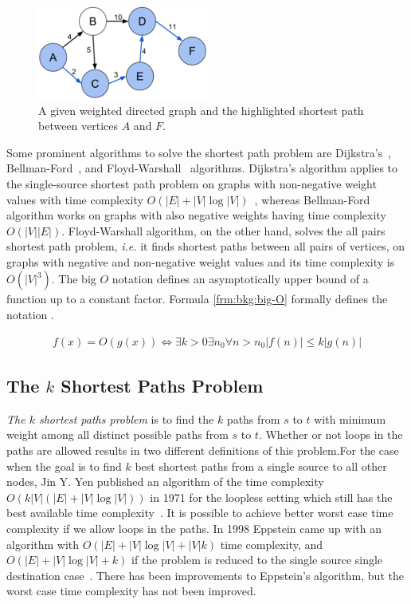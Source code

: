\begin{figure}[!ht]
  \centering
  \includegraphics[width=0.5\textwidth]{figs/background/Shortest_path_with_direct_weights}
  \caption{A given weighted directed graph and the highlighted shortest path between vertices $A$ and $F$.}
  \label{fig:shortest-path1}
\end{figure}

Some prominent algorithms to solve the shortest path problem are Dijkstra's~\cite{dijkstra}, Bellman-Ford~\cite{bellman-ford}, and Floyd-Warshall~\cite{floyd-warshall} algorithms. Dijkstra's algorithm applies to the single-source shortest path problem on graphs with non-negative weight values with time complexity $O(|E| + |V| \log |V|)$~\cite{fredman1987fibonacci}, whereas Bellman-Ford algorithm works on graphs with also negative weights having time complexity $O(|V| |E|)$. Floyd-Warshall algorithm, on the other hand, solves the all pairs shortest path problem, \emph{i.e.} it finds shortest paths between all pairs of vertices, on graphs with negative and non-negative weight values and its time complexity is $O(|V|^3)$. The big $O$ notation defines an asymptotically upper bound of a function up to a constant factor. Formula \ref{frm:bkg:big-O} formally defines the notation \cite{thomas2001introduction}. 

\begin{align}
  f(x) = O(g(x)) \iff \exists k > 0 \exists n_0 \forall n > n_0 |f(n)| \leq k|g(n)|
  \label{frm:bkg:big-O}
\end{align}


\subsection{The $k$ Shortest Paths Problem}
\emph{The $k$ shortest paths problem} is to find the $k$ paths from $s$ to $t$ with minimum weight among all distinct possible paths from $s$ to $t$. Whether or not loops in the paths are allowed results in two different definitions of this problem.For the case when the goal is to find $k$ best shortest paths from a single source to all other nodes, Jin Y. Yen published an algorithm of the time complexity $O(k |V|(|E|+|V|\log|V|))$ in 1971 for the loopless setting which still has the best available time complexity~\cite{yen1971finding}. It is possible to achieve better worst case time complexity if we allow loops in the paths. In 1998 Eppstein came up with an algorithm with $O(|E| + |V|\log|V| + |V| k)$ time complexity, and $O(|E| + |V|\log|V| + k)$ if the problem is reduced to the single source single destination case~\cite{eppstein1998finding}. There has been improvements to Eppstein's algorithm, but the worst case time complexity has not been improved.

